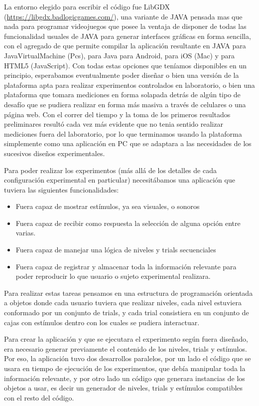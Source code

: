 \documentclass{article}
\begin{document}
    La entorno elegido para escribir el código fue LibGDX (\url{https://libgdx.badlogicgames.com/}), una variante de JAVA pensada mas que nada para programar videojuegos que posee la ventaja de disponer de todas las funcionalidad usuales de JAVA para generar interfaces gráficas en forma sencilla, con el agregado de que permite compilar la aplicación resultante en JAVA para JavaVirtualMachine (Pcs), para Java para Android, para iOS (Mac) y para HTML5 (JavaScript). Con todas estas opciones que teníamos disponibles en un principio, esperabamos eventualmente poder diseñar o bien una versión de la plataforma apta para realizar experimentos controlados en laboratorio, o bien una plataforma que tomara mediciones en forma solapada detrás de algún tipo de desafío que se pudiera realizar en forma más masiva a través de celulares o una página web. Con el correr del tiempo y la toma de los primeros resultados preliminares resultó cada vez más evidente que no tenia sentido realizar mediciones fuera del laboratorio, por lo que terminamos usando la plataforma simplemente como una aplicación en PC que se adaptara a las necesidades de los sucesivos diseños experimentales.
    
    Para poder realizar los experimentos (más allá de los detalles de cada configuración experimental en particular) necesitábamos una aplicación que tuviera las siguientes funcionalidades:
    
    \begin{itemize}
        \item Fuera capaz de mostrar estímulos, ya sea visuales, o sonoros
        \item Fuera capaz de recibir como respuesta la selección de alguna opción entre varias.
        \item Fuera capaz de manejar una lógica de niveles y trials secuenciales
        \item Fuera capaz de registrar y almacenar toda la información relevante para poder reproducir lo que usuario o sujeto experimental realizara. 
    \end{itemize}
    
    Para realizar estas tareas pensamos en una estructura de programación orientada a objetos donde cada usuario tuviera que realizar niveles, cada nivel estuviera conformado por un conjunto de trials, y cada trial consistiera en un conjunto de cajas con estímulos dentro con los cuales se pudiera interactuar. 
    
    Para crear la aplicación y que se ejecutara el experimento según fuera diseñado, era necesario generar previamente el contenido de los niveles, trials y estímulos. Por eso, la aplicación tuvo dos desarrollos paralelos, por un lado el código que se usara en tiempo de ejecución de los experimentos, que debía manipular toda la información relevante, y por otro lado un código que generara instancias de los objetos a usar, es decir un generador de niveles, trials y estímulos compatibles con el resto del código.
    
\end{document}
